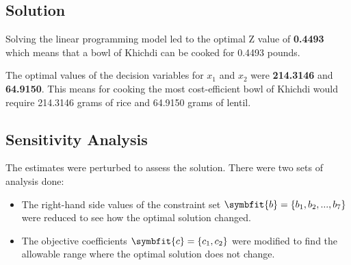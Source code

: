 \documentclass[
]{article}
\begin{document}
\newpage

\hypertarget{solution}{%
	\subsection{Solution}\label{solution}}
Solving the linear programming model led to the optimal Z value of \textbf{0.4493} which means that a bowl of Khichdi can be cooked for 0.4493 pounds.

The optimal values of the decision variables for \(x_1\) and \(x_2\) were \textbf{214.3146} and \textbf{64.9150}. 
This means for cooking the most cost-efficient bowl of Khichdi would require 214.3146 grams of rice and 64.9150 grams of lentil.

\hypertarget{sensitivity-analysis}{%
	\subsection{Sensitivity Analysis}\label{sensitivity-analysis}}

The estimates were perturbed to assess the solution. There were two sets of analysis done:
\begin{itemize}
	\item The right-hand side values of the constraint set $\symbfit{b} = \{b_1, b_2, ..., b_7\}$ were reduced to see how the optimal solution changed.
	\item The objective coefficients $\symbfit{c} = \{c_1, c_2 \}$ were modified to find the allowable range where the optimal solution does not change.
\end{itemize}

\vspace{4em}
\end{document}
